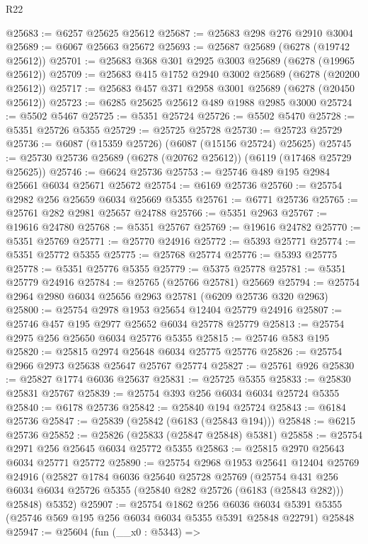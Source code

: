 \begin{lexlean}{R22}
\begin{coremodule}
@25683 := @6257 @25625 @25612
@25687 := @25683 @298 @276 @2910 @3004
@25689 := @6067 @25663 @25672
@25693 := @25687 @25689 (@6278 (@19742 @25612))
@25701 := @25683 @368 @301 @2925 @3003 @25689 (@6278 (@19965 @25612))
@25709 := @25683 @415 @1752 @2940 @3002 @25689 (@6278 (@20200 @25612))
@25717 := @25683 @457 @371 @2958 @3001 @25689 (@6278 (@20450 @25612))
@25723 := @6285 @25625 @25612 @489 @1988 @2985 @3000
@25724 := @5502 @5467
@25725 := @5351 @25724
@25726 := @5502 @5470
@25728 := @5351 @25726 @5355
@25729 := @25725 @25728
@25730 := @25723 @25729
@25736 := @6087 (@15359 @25726) (@6087 (@15156 @25724) @25625)
@25745 := @25730 @25736 @25689 (@6278 (@20762 @25612)) (@6119 (@17468 @25729 @25625))
@25746 := @6624 @25736
@25753 := @25746 @489 @195 @2984 @25661 @6034 @25671 @25672
@25754 := @6169 @25736
@25760 := @25754 @2982 @256 @25659 @6034 @25669 @5355
@25761 := @6771 @25736
@25765 := @25761 @282 @2981 @25657 @24788
@25766 := @5351 @2963
@25767 := @19616 @24780
@25768 := @5351 @25767
@25769 := @19616 @24782
@25770 := @5351 @25769
@25771 := @25770 @24916
@25772 := @5393 @25771
@25774 := @5351 @25772 @5355
@25775 := @25768 @25774
@25776 := @5393 @25775
@25778 := @5351 @25776 @5355
@25779 := @5375 @25778
@25781 := @5351 @25779 @24916
@25784 := @25765 (@25766 @25781) @25669
@25794 := @25754 @2964 @2980 @6034 @25656 @2963 @25781 (@6209 @25736 @320 @2963)
@25800 := @25754 @2978 @1953 @25654 @12404 @25779 @24916
@25807 := @25746 @457 @195 @2977 @25652 @6034 @25778 @25779
@25813 := @25754 @2975 @256 @25650 @6034 @25776 @5355
@25815 := @25746 @583 @195
@25820 := @25815 @2974 @25648 @6034 @25775 @25776
@25826 := @25754 @2966 @2973 @25638 @25647 @25767 @25774
@25827 := @25761 @926
@25830 := @25827 @1774 @6036 @25637
@25831 := @25725 @5355
@25833 := @25830 @25831 @25767
@25839 := @25754 @393 @256 @6034 @6034 @25724 @5355
@25840 := @6178 @25736
@25842 := @25840 @194 @25724
@25843 := @6184 @25736
@25847 := @25839 (@25842 (@6183 (@25843 @194)))
@25848 := @6215 @25736
@25852 := @25826 (@25833 (@25847 @25848) @5381)
@25858 := @25754 @2971 @256 @25645 @6034 @25772 @5355
@25863 := @25815 @2970 @25643 @6034 @25771 @25772
@25890 := @25754
    @2968
    @1953
    @25641
    @12404
    @25769
    @24916
    (@25827
      @1784
      @6036
      @25640
      @25728
      @25769
      (@25754 @431 @256 @6034 @6034 @25726 @5355 (@25840 @282 @25726 (@6183 (@25843 @282))) @25848)
      @5352)
@25907 := @25754
    @1862
    @256
    @6036
    @6034
    @5391
    @5355
    (@25746 @569 @195 @256 @6034 @6034 @5355 @5391 @25848 @22791)
    @25848
@25947 := @25604
    (fun (__x0 : @5343) =>

\end{coremodule}
\end{lexlean}
